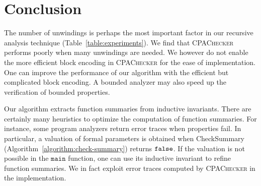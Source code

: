 
\chapter{Conclusion}\label{ch:conclusion}


The number of unwindings is perhaps the most important factor in our
recursive analysis technique (Table~\ref{table:experiments}). We find
that \textsc{CPAChecker} performs poorly when many unwindings are
needed. We however do not enable the more efficient block encoding in
\textsc{CPAChecker} for the ease of implementation. One can improve
the performance of our algorithm with the efficient but complicated
block encoding. A bounded analyzer may also speed up the
verification of bounded properties. 

Our algorithm extracts function summaries from inductive invariants. 
There are certainly many heuristics to optimize the computation of
function summaries. For instance, some program analyzers return error
traces when properties fail. In particular, a valuation of formal
parameters is obtained when \textmd{CheckSummary}
(Algorithm~\ref{algorithm:check-summary}) returns $\mathtt{false}$. If the
valuation is not possible in the $\mathtt{main}$ function, one can use
its inductive invariant to refine function summaries. We in 
fact exploit error traces computed by \textsc{CPAChecker} in the
implementation. 
